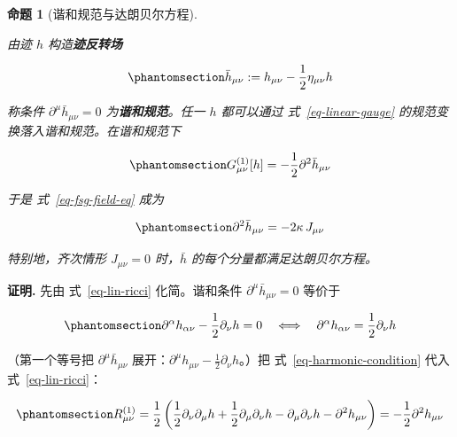 \documentclass[
  chinese,
  a4paper,
  UTF8,
  12pt,
  oneside,
  openany]{ctexbook}
\theoremstyle{plain}
\theoremstyle{plain}
\theoremstyle{plain}
\newtheorem{proposition}{命题}[chapter]
\theoremstyle{definition}
\theoremstyle{plain}
\theoremstyle{plain}
\theoremstyle{remark}
\begin{document}
\begin{proposition}[谐和规范与达朗贝尔方程]\protect\hypertarget{prp-harmonic-gauge}{}\label{prp-harmonic-gauge}

由迹 \(h\) 构造\textbf{迹反转场}

\begin{equation}\protect\phantomsection\label{eq-trace-reverse}{
\bar h_{\mu\nu} := h_{\mu\nu}-\frac{1}{2}\eta_{\mu\nu}h
}\end{equation}

称条件 \(\partial^{\mu}\bar h_{\mu\nu}=0\) 为\textbf{谐和规范}。任一
\(h\) 都可以通过 式~\ref{eq-linear-gauge}
的规范变换落入谐和规范。在谐和规范下

\begin{equation}\protect\phantomsection\label{eq-harmonic-g}{
G^{(1)}_{\mu\nu}[h] = -\frac{1}{2}\partial^{2}\bar h_{\mu\nu}
}\end{equation}

于是 式~\ref{eq-fsg-field-eq} 成为

\begin{equation}\protect\phantomsection\label{eq-wave-eq-fsg}{
\partial^{2}\bar h_{\mu\nu} = -2\kappa\,J_{\mu\nu}
}\end{equation}

特别地，齐次情形 \(J_{\mu\nu}=0\) 时，\(\bar h\)
的每个分量都满足达朗贝尔方程。

\end{proposition}

\textbf{证明.} 先由 式~\ref{eq-lin-ricci} 化简。谐和条件
\(\partial^{\mu}\bar h_{\mu\nu}=0\) 等价于

\begin{equation}\protect\phantomsection\label{eq-harmonic-condition}{
\partial^{\alpha}h_{\alpha\nu}-\frac{1}{2}\partial_{\nu}h=0
\quad\Longleftrightarrow\quad
\partial^{\alpha}h_{\alpha\nu}=\frac{1}{2}\partial_{\nu}h
}\end{equation}

（第一个等号把 \(\partial^{\mu}\bar h_{\mu\nu}\)
展开：\(\partial^{\mu}h_{\mu\nu}-\frac{1}{2}\partial_{\nu}h\)。）把
式~\ref{eq-harmonic-condition} 代入 式~\ref{eq-lin-ricci}：

\begin{equation}\protect\phantomsection\label{eq-ricci-harmonic}{
R^{(1)}_{\mu\nu}
=\frac{1}{2}\left(\frac{1}{2}\partial_{\nu}\partial_{\mu}h+\frac{1}{2}\partial_{\mu}\partial_{\nu}h-\partial_{\mu}\partial_{\nu}h-\partial^{2}h_{\mu\nu}\right)
=-\frac{1}{2}\partial^{2}h_{\mu\nu}
}\end{equation}
\end{document}
